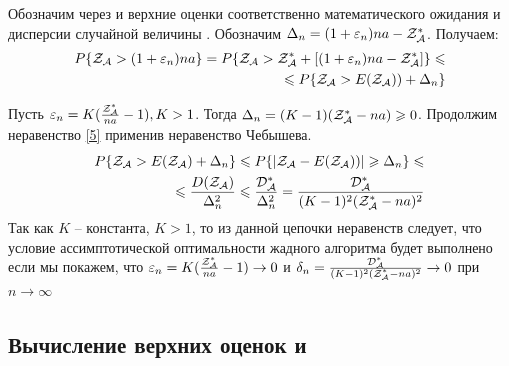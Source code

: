 \documentclass[a4paper, 14pt]{extarticle}
\numberwithin{equation}{section}
\begin{document}
Обозначим через \topboundE{} и \topboundD{} верхние оценки соответственно математического ожидания \randomvalueE{} и дисперсии \randomvalueD{} случайной величины \randomvalue{} . Обозначим $\Delta_n=(1+\varepsilon_n)na-\text{$\mathcal{Z^*_{A}}$}$. Получаем:
\begin{equation}\label{5}
\begin{aligned}
P\{\text{$\mathcal{Z_{A}}$} > (1+\varepsilon_n)na\} = 
P\{\text{$\mathcal{Z_{A}}$} > \text{$\mathcal{Z^*_{A}}$}+[(1+\varepsilon_n)na-\text{$\mathcal{Z^*_{A}}$}]\} \leqslant \\
\leqslant
P\{\text{$\mathcal{Z_{A}}$} > \text{$E(\text{$\mathcal{Z_{A}}$})$})+ \Delta_n\}
\end{aligned}
\end{equation}

Пусть $\varepsilon_n = K(\frac{\text{$\mathcal{Z^*_{A}}$}}{na}-1), K>1$.
Тогда $ \Delta_n = (K-1)(\text{$\mathcal{Z^*_{A}}$}-na) \geqslant 0$.
Продолжим неравенство \eqref{5} применив неравенство Чебышева.
\begin{equation}\label{6}
\begin{aligned}
P\{\text{$\mathcal{Z_{A}}$}> E(\text{$\mathcal{Z_{A}}$})+ \Delta_n\} \leqslant 
P\{|\text{$\mathcal{Z_{A}}$}- \text{$E(\text{$\mathcal{Z_{A}}$})$})| \geqslant \Delta_n\} \leqslant \\
\leqslant \frac{\text{$D(\text{$\mathcal{Z_{A}}$})$}}{\Delta^2_n} \leqslant
\frac{\text{$\mathcal{D^*_{A}}$}}{\Delta^2_n} = 
\frac{\text{$\mathcal{D^*_{A}}$}}{(K-1)^2(\text{$\mathcal{Z^*_{A}}$}-na)^2}
\end{aligned}
\end{equation}
Так как $K$ -- константа, $K>1$, то из данной цепочки неравенств следует, что условие ассимптотической оптимальности жадного алгоритма будет выполнено если мы покажем, что
$ \varepsilon_n=K(\frac{\text{$\mathcal{Z^*_{A}}$}}{na}-1) \rightarrow 0$ и 
$ \delta_n = \frac{\text{$\mathcal{D^*_{A}}$}}{(K-1)^2(\text{$\mathcal{Z^*_{A}}$}-na)^2} \rightarrow 0$ при $ n \rightarrow \infty$\\

\subsection{Вычисление верхних оценок \topboundE{} и \topboundD{}}

\newcommand{\chanceLklesserX}{$\Phi_k(x)$}
\newcommand{\randomNormalValueE}{$l_k$}
\end{document}

